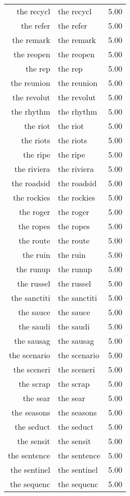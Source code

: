 \begin{table}[ht]
\begin{tabular}{rlr}
  the recycl & the recycl & 5.00 \\ 
  the refer & the refer & 5.00 \\ 
  the remark & the remark & 5.00 \\ 
  the reopen & the reopen & 5.00 \\ 
  the rep & the rep & 5.00 \\ 
  the reunion & the reunion & 5.00 \\ 
  the revolut & the revolut & 5.00 \\ 
  the rhythm & the rhythm & 5.00 \\ 
  the riot & the riot & 5.00 \\ 
  the riots & the riots & 5.00 \\ 
  the ripe & the ripe & 5.00 \\ 
  the riviera & the riviera & 5.00 \\ 
  the roadsid & the roadsid & 5.00 \\ 
  the rockies & the rockies & 5.00 \\ 
  the roger & the roger & 5.00 \\ 
  the ropes & the ropes & 5.00 \\ 
  the route & the route & 5.00 \\ 
  the ruin & the ruin & 5.00 \\ 
  the runup & the runup & 5.00 \\ 
  the russel & the russel & 5.00 \\ 
  the sanctiti & the sanctiti & 5.00 \\ 
  the sauce & the sauce & 5.00 \\ 
  the saudi & the saudi & 5.00 \\ 
  the sausag & the sausag & 5.00 \\ 
  the scenario & the scenario & 5.00 \\ 
  the sceneri & the sceneri & 5.00 \\ 
  the scrap & the scrap & 5.00 \\ 
  the sear & the sear & 5.00 \\ 
  the seasons & the seasons & 5.00 \\ 
  the seduct & the seduct & 5.00 \\ 
  the sensit & the sensit & 5.00 \\ 
  the sentence & the sentence & 5.00 \\ 
  the sentinel & the sentinel & 5.00 \\ 
  the sequenc & the sequenc & 5.00 \\ 

\end{tabular}
\end{table}
